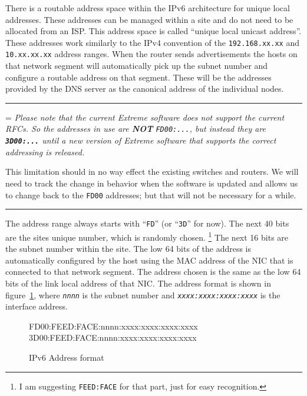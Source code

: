 \documentclass[twoside]{article}
\newenvironment{note}
{\begin{center}\begin{minipage}{0.8\textwidth}
\vspace{2ex}\hrule\vspace{1ex}
\parskip=\medskipamount
\em}
{\par 
\vspace{1ex}\hrule\vspace{2ex}
\end{minipage}\end{center}}
\begin{document}
There is a routable address space within the IPv6 architecture
for unique local addresses.
These addresses can be managed within a site and do not need
to be allocated from an ISP.
This address space is called ``unique local unicast address''.
These addresses work similarly to
the IPv4 convention of the \verb+192.168.xx.xx+
and \verb+10.xx.xx.xx+ address ranges.
When the router sends advertisements the hosts on that network
segment will automatically pick up the subnet number and 
configure a routable address on that segment.
These will be the addresses provided by the DNS server as the
canonical address of the individual nodes.

\begin{note}
Please note that the current Extreme software does not support the current RFCs.
So the addresses in use are {\bf NOT} \verb+FD00:...+, but instead they are
{\bf \verb+3D00:...+} until a new version of Extreme software that supports
the correct addressing is released.

This limitation should in no way effect the existing switches and routers.
We will need to track the change in behavior when the software is updated
and allows us to change back to the \verb+FD00+ addresses; but that will
not be necessary for a while.
\end{note}

The address range always starts with ``\verb+FD+''
(or ``\verb+3D+'' for now).
The next 40 bits are the sites unique number,
which is randomly chosen.
\footnote{I am suggesting {\tt FEED:FACE} for that part, just for easy recognition.}
The next 16 bits are the subnet number within the site.
The low 64 bits of the address is automatically configured by the
host using the MAC address of the NIC that is connected to that
network segment.
The address chosen is the same as the low 64 bits of the
link local address of that NIC.
The address format is shown in figure~\ref{ipv6:address:format},
where {\em \verb+nnnn+} is the subnet number and
{\em \verb+xxxx:xxxx:xxxx:xxxx+} is the interface address.

\begin{figure}[!h]
\begin{center}
\begin{boxedverbatim}
FD00:FEED:FACE:nnnn:xxxx:xxxx:xxxx:xxxx
3D00:FEED:FACE:nnnn:xxxx:xxxx:xxxx:xxxx
\end{boxedverbatim}
\end{center}
\caption{IPv6 Address format}\label{ipv6:address:format}
\end{figure}
\end{document}
